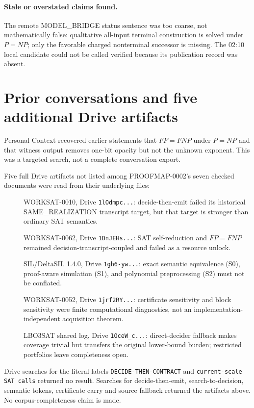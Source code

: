 \documentclass[11pt]{article}
\begin{document}
\paragraph{Stale or overstated claims found.}
The remote MODEL\_BRIDGE status sentence was too coarse, not mathematically
false: qualitative all-input terminal construction is solved under
$P=NP$; only the favorable charged nonterminal successor is missing.  The
02:10 local candidate could not be called verified because its publication
record was absent.

\section{Prior conversations and five additional Drive artifacts}
Personal Context recovered earlier statements that $FP=FNP$ under $P=NP$
and that witness output removes one-bit opacity but not the unknown exponent.
This was a targeted search, not a complete conversation export.

Five full Drive artifacts not listed among PROOFMAP-0002's seven checked
documents were read from their underlying files:
\begin{description}
\item[] WORKSAT-0010, Drive \texttt{1lOdmpc...}: decide-then-emit failed its
historical SAME\_REALIZATION transcript target, but that target is stronger
than ordinary SAT semantics.
\item[] WORKSAT-0062, Drive \texttt{1DnJEHs...}: SAT self-reduction and
$FP=FNP$ remained decision-transcript-coupled and failed as a resource
unlock.
\item[] SIL/DeltaSIL 1.4.0, Drive \texttt{1gh6-yw...}: exact semantic
equivalence (S0), proof-aware simulation (S1), and polynomial preprocessing
(S2) must not be conflated.
\item[] WORKSAT-0052, Drive \texttt{1jrf2RY...}: certificate sensitivity and
block sensitivity were finite computational diagnostics, not an
implementation-independent acquisition theorem.
\item[] LBO3SAT shared log, Drive \texttt{1OceW\_c...}: direct-decider
fallback makes coverage trivial but transfers the original lower-bound
burden; restricted portfolios leave completeness open.
\end{description}
Drive searches for the literal labels \texttt{DECIDE-THEN-CONTRACT} and
\texttt{current-scale SAT calls} returned no result.  Searches for
decide-then-emit, search-to-decision, semantic tokens, certificate carry and
source fallback returned the artifacts above.  No corpus-completeness claim
is made.
\end{document}
